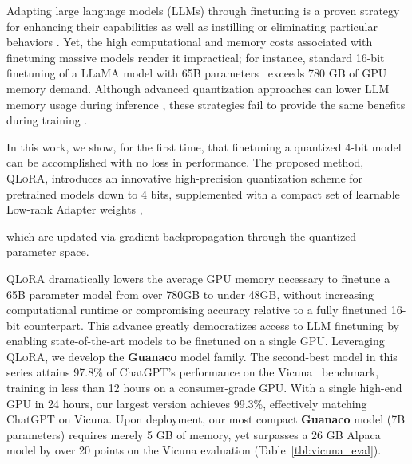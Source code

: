 Adapting large language models (LLMs) through finetuning is a proven strategy for enhancing their capabilities \citep{min2021metaicl, wei2021finetuned, ouyang2022training, wang2022super, wang2022self, liu2022few} as well as instilling or eliminating particular behaviors \citep{ouyang2022training,askell2021general,bai2022training}. Yet, the high computational and memory costs associated with finetuning massive models render it impractical; for instance, standard 16-bit finetuning of a LLaMA model with 65B parameters~\citep{touvron2023llama} exceeds 780 GB of GPU memory demand. Although advanced quantization approaches can lower LLM memory usage during inference \citep{dettmers2022llm, dettmers2022case, frantar2022gptq, xiao2022smoothquant}, these strategies fail to provide the same benefits during training \citep{wortsman2023stable}. 

In this work, we show, for the first time, that finetuning a quantized 4-bit model can be accomplished with no loss in performance. The proposed method, \textsc{QLoRA}, introduces an innovative high-precision quantization scheme for pretrained models down to 4 bits, supplemented with a compact set of learnable Low-rank Adapter weights \citep{hu2021lora}, 

which are updated via gradient backpropagation through the quantized parameter space. 

\textsc{QLoRA} dramatically lowers the average GPU memory necessary to finetune a 65B parameter model from over 780GB to under 48GB, without increasing computational runtime or compromising accuracy relative to a fully finetuned 16-bit counterpart. This advance greatly democratizes access to LLM finetuning by enabling state-of-the-art models to be finetuned on a single GPU. Leveraging \textsc{QLoRA}, we develop the \textbf{Guanaco} model family. The second-best model in this series attains 97.8\% of ChatGPT’s performance on the Vicuna~\citep{vicuna2023} benchmark, training in less than 12 hours on a consumer-grade GPU. With a single high-end GPU in 24 hours, our largest version achieves 99.3\%, effectively matching ChatGPT on Vicuna. Upon deployment, our most compact \textbf{Guanaco} model (7B parameters) requires merely 5 GB of memory, yet surpasses a 26 GB Alpaca model by over 20 points on the Vicuna evaluation (Table~\ref{tbl:vicuna_eval}).

